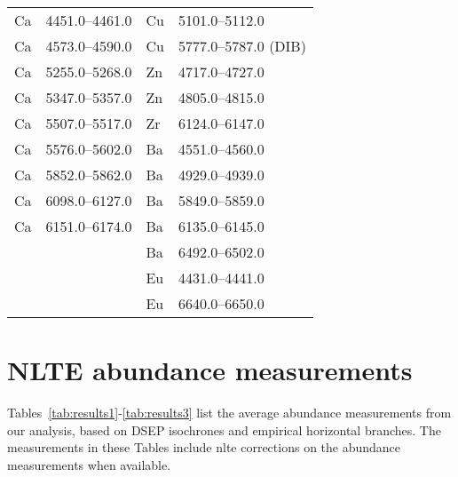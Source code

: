 \documentclass{aa}
\begin{document}
\begin{appendix}
\begin{table}[!h]
\begin{adjustbox}{height=0.45\textheight}
\begin{tabular}{l l l l}
Ca & 4451.0--4461.0 & Cu & 5101.0--5112.0 \\
Ca & 4573.0--4590.0 & Cu & 5777.0--5787.0 (DIB) \\
Ca & 5255.0--5268.0 & Zn & 4717.0--4727.0 \\
Ca & 5347.0--5357.0 & Zn & 4805.0--4815.0 \\
Ca & 5507.0--5517.0 & Zr & 6124.0--6147.0 \\
Ca & 5576.0--5602.0 & Ba & 4551.0--4560.0 \\
Ca & 5852.0--5862.0 & Ba & 4929.0--4939.0 \\
Ca & 6098.0--6127.0 & Ba & 5849.0--5859.0 \\
Ca & 6151.0--6174.0 & Ba & 6135.0--6145.0 \\
& & Ba & 6492.0--6502.0 \\
& & Eu & 4431.0--4441.0 \\
& & Eu & 6640.0--6650.0 \\
\hline
\end{tabular}
\end{adjustbox}
\end{table}

\clearpage

\section{NLTE abundance measurements}

Tables~\ref{tab:results1}-\ref{tab:results3} list the average abundance measurements from our analysis, based on DSEP isochrones and empirical horizontal branches. The measurements in these Tables include \ac{nlte} corrections on the abundance measurements when available. 


\end{appendix}
\end{document}
